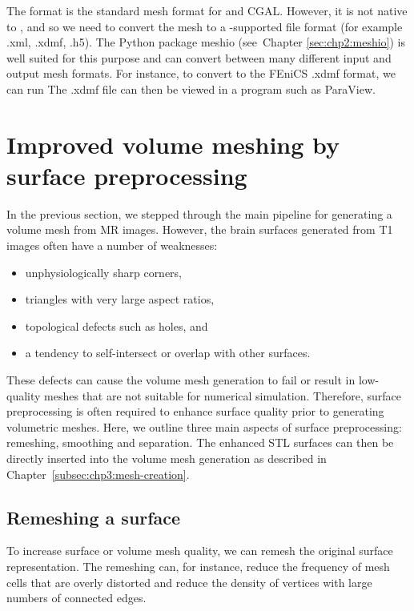 The  format is the standard mesh format for \svmtk{} and
CGAL. However, it is not native to \fenics{}, and so we need to
convert the mesh to a \fenics-supported file format (for example .xml, .xdmf,
.h5). The Python package meshio (see~Chapter
\ref{sec:chp2:meshio}) is well suited for this purpose and can
convert between many different input and output mesh formats. For
instance, to convert to the FEniCS .xdmf format, we can run
\noindent The .xdmf file can then be viewed in a program such as
ParaView.

\section{Improved volume meshing by surface preprocessing}
\label{sec:chp3:improved-volume-meshing}
In the previous section, we stepped through the main pipeline for
generating a volume mesh from MR images. However, the brain surfaces
generated from T1 images often have a number of weaknesses:
\begin{itemize}
\item unphysiologically sharp corners,   
\item triangles with very large aspect ratios, 
\item topological defects such as holes, and
\item a tendency to self-intersect or overlap with other surfaces.  
\end{itemize}
These defects can cause the volume mesh generation to fail or result
in low-quality meshes that are not suitable for numerical
simulation. Therefore, surface preprocessing is often required to
enhance surface quality prior to generating volumetric meshes. Here,
we outline three main aspects of surface preprocessing: remeshing,
smoothing and separation. The enhanced STL surfaces can then be
directly inserted into the volume mesh generation as described in
Chapter~\ref{subsec:chp3:mesh-creation}.

\subsection{Remeshing a surface}
\label{subsubsec:chp3:mesh-creation:remeshing}

To increase surface or volume mesh quality, we can remesh the original
surface representation. The remeshing can, for instance, reduce the
frequency of mesh cells that are overly distorted and reduce the
density of vertices with large numbers of connected edges.

